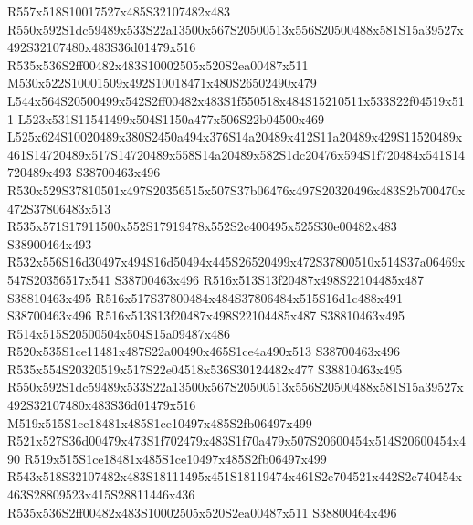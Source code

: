 \documentclass{article}
\begin{document}
\begin{multicols}{2}
R557x518S10017527x485S32107482x483 R550x592S1dc59489x533S22a13500x567S20500513x556S20500488x581S15a39527x492S32107480x483S36d01479x516 R535x536S2ff00482x483S10002505x520S2ea00487x511 M530x522S10001509x492S10018471x480S26502490x479 L544x564S20500499x542S2ff00482x483S1f550518x484S15210511x533S22f04519x511 L523x531S11541499x504S1150a477x506S22b04500x469 L525x624S10020489x380S2450a494x376S14a20489x412S11a20489x429S11520489x461S14720489x517S14720489x558S14a20489x582S1dc20476x594S1f720484x541S14720489x493 S38700463x496 R530x529S37810501x497S20356515x507S37b06476x497S20320496x483S2b700470x472S37806483x513 R535x571S17911500x552S17919478x552S2c400495x525S30e00482x483 S38900464x493 R532x556S16d30497x494S16d50494x445S26520499x472S37800510x514S37a06469x547S20356517x541 S38700463x496 R516x513S13f20487x498S22104485x487 S38810463x495 R516x517S37800484x484S37806484x515S16d1c488x491 S38700463x496 R516x513S13f20487x498S22104485x487 S38810463x495 R514x515S20500504x504S15a09487x486 R520x535S1ce11481x487S22a00490x465S1ce4a490x513 S38700463x496 R535x554S20320519x517S22e04518x536S30124482x477 S38810463x495 R550x592S1dc59489x533S22a13500x567S20500513x556S20500488x581S15a39527x492S32107480x483S36d01479x516 M519x515S1ce18481x485S1ce10497x485S2fb06497x499 R521x527S36d00479x473S1f702479x483S1f70a479x507S20600454x514S20600454x490 R519x515S1ce18481x485S1ce10497x485S2fb06497x499 R543x518S32107482x483S18111495x451S18119474x461S2e704521x442S2e740454x463S28809523x415S28811446x436 R535x536S2ff00482x483S10002505x520S2ea00487x511 S38800464x496







\end{multicols}
\end{document}
